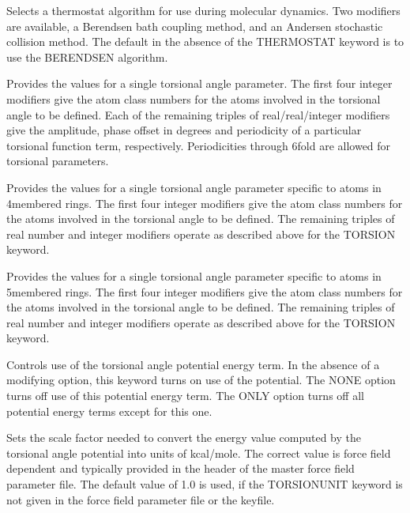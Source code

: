 \documentclass[letterpaper,11pt,english]{sphinxmanual}
\begin{document}

  Selects a thermostat algorithm for use during molecular dynamics. Two modifiers are available, a Berendsen bath coupling method, and an Andersen stochastic collision method. The default in the absence of the THERMOSTAT keyword is to use the BERENDSEN algorithm.


  Provides the values for a single torsional angle parameter. The first four integer modifiers give the atom class numbers for the atoms involved in the torsional angle to be defined. Each of the remaining triples of real/real/integer modifiers give the amplitude, phase offset in degrees and periodicity of a particular torsional function term, respectively. Periodicities through 6\sphinxhyphen{}fold are allowed for torsional parameters.

  Provides the values for a single torsional angle parameter specific to atoms in 4\sphinxhyphen{}membered rings. The first four integer modifiers give the atom class numbers for the atoms involved in the torsional angle to be defined. The remaining triples of real number and integer modifiers operate as described above for the TORSION keyword.

  Provides the values for a single torsional angle parameter specific to atoms in 5\sphinxhyphen{}membered rings. The first four integer modifiers give the atom class numbers for the atoms involved in the torsional angle to be defined. The remaining triples of real number and integer modifiers operate as described above for the TORSION keyword.

  Controls use of the torsional angle potential energy term. In the absence of a modifying option, this keyword turns on use of the potential. The NONE option turns off use of this potential energy term. The ONLY option turns off all potential energy terms except for this one.

  Sets the scale factor needed to convert the energy value computed by the torsional angle potential into units of kcal/mole. The correct value is force field dependent and typically provided in the header of the master force field parameter file. The default value of 1.0 is used, if the TORSIONUNIT keyword is not given in the force field parameter file or the keyfile.
\end{document}
